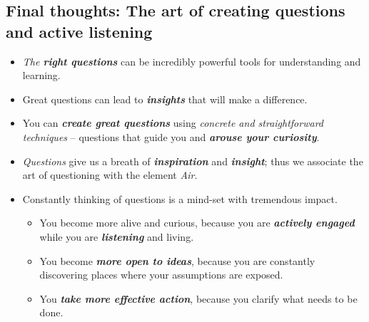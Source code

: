 \documentclass[11pt]{article}
\begin{document}
\subsection{Final thoughts: The art of creating questions and active listening}
\begin{itemize}
\item \emph{The \textbf{right questions}} can be incredibly powerful tools for understanding and learning. 

\item Great questions can lead to \emph{\textbf{insights}} that will make a difference. 

\item You can \emph{\textbf{create great questions}} using \emph{concrete and straightforward techniques} -- questions that guide you and \emph{\textbf{arouse your curiosity}}. 

\item \emph{Questions} give us a breath of \emph{\textbf{inspiration}} and \emph{\textbf{insight}}; thus we associate the art of questioning with the element \emph{Air}.

\item Constantly thinking of questions is a mind-set with tremendous impact. 
\begin{itemize}
\item You become more alive and curious, because you are \emph{\textbf{actively engaged}} while you are \emph{\textbf{listening}} and living. 

\item You become \emph{\textbf{more open to ideas}}, because you are constantly discovering places where your assumptions are exposed. 

\item You \emph{\textbf{take more effective action}}, because you clarify what needs to be done.
\end{itemize}
\end{itemize}
\end{document}
